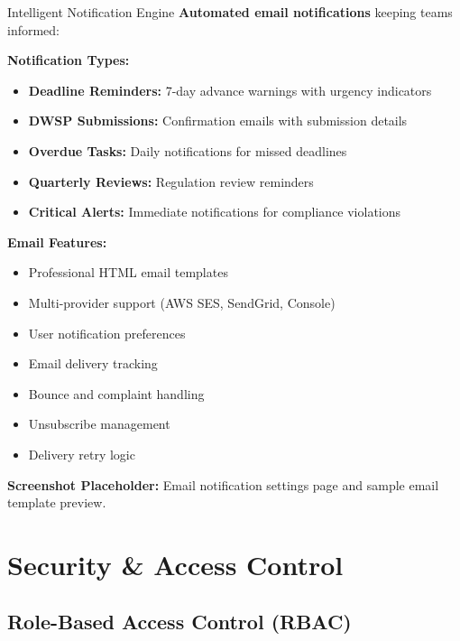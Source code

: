 \documentclass[11pt,a4paper]{article}
\begin{document}
\begin{featurebox}{Intelligent Notification Engine}
    \textbf{Automated email notifications} keeping teams informed:

    \vspace{0.5cm}
    \textbf{Notification Types:}
    \begin{itemize}[itemsep=0.3em]
        \item \textbf{Deadline Reminders:} 7-day advance warnings with urgency indicators
        \item \textbf{DWSP Submissions:} Confirmation emails with submission details
        \item \textbf{Overdue Tasks:} Daily notifications for missed deadlines
        \item \textbf{Quarterly Reviews:} Regulation review reminders
        \item \textbf{Critical Alerts:} Immediate notifications for compliance violations
    \end{itemize}

    \vspace{0.5cm}
    \textbf{Email Features:}
    \begin{itemize}[itemsep=0.2em]
        \item Professional HTML email templates
        \item Multi-provider support (AWS SES, SendGrid, Console)
        \item User notification preferences
        \item Email delivery tracking
        \item Bounce and complaint handling
        \item Unsubscribe management
        \item Delivery retry logic
    \end{itemize}
\end{featurebox}

\vspace{0.5cm}

\textbf{Screenshot Placeholder:} Email notification settings page and sample email template preview.

\newpage

\section{Security \& Access Control}

\subsection{Role-Based Access Control (RBAC)}
\end{document}

